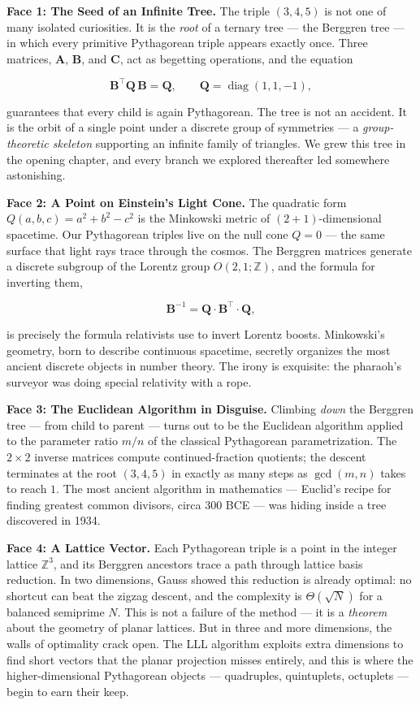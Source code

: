 \textbf{Face 1: The Seed of an Infinite Tree.} The triple \((3, 4, 5)\) is not one of many isolated curiosities. It is the \emph{root} of a ternary tree --- the Berggren tree --- in which every primitive Pythagorean triple appears exactly once. Three matrices, \(\mathbf{A}\), \(\mathbf{B}\), and \(\mathbf{C}\), act as begetting operations, and the equation

\[
\mathbf{B}^{\!\top} \mathbf{Q}\, \mathbf{B} = \mathbf{Q}, \qquad \mathbf{Q} = \operatorname{diag}(1, 1, -1),
\]

guarantees that every child is again Pythagorean. The tree is not an accident. It is the orbit of a single point under a discrete group of symmetries --- a \emph{group-theoretic skeleton} supporting an infinite family of triangles. We grew this tree in the opening chapter, and every branch we explored thereafter led somewhere astonishing.

\textbf{Face 2: A Point on Einstein's Light Cone.} The quadratic form \(Q(a, b, c) = a^2 + b^2 - c^2\) is the Minkowski metric of \((2{+}1)\)-dimensional spacetime. Our Pythagorean triples live on the null cone \(Q = 0\) --- the same surface that light rays trace through the cosmos. The Berggren matrices generate a discrete subgroup of the Lorentz group \(O(2,1;\mathbb{Z})\), and the formula for inverting them,

\[
\mathbf{B}^{-1} = \mathbf{Q} \cdot \mathbf{B}^{\!\top} \cdot \mathbf{Q},
\]

is precisely the formula relativists use to invert Lorentz boosts. Minkowski's geometry, born to describe continuous spacetime, secretly organizes the most ancient discrete objects in number theory. The irony is exquisite: the pharaoh's surveyor was doing special relativity with a rope.

\textbf{Face 3: The Euclidean Algorithm in Disguise.} Climbing \emph{down} the Berggren tree --- from child to parent --- turns out to be the Euclidean algorithm applied to the parameter ratio \(m/n\) of the classical Pythagorean parametrization. The \(2 \times 2\) inverse matrices compute continued-fraction quotients; the descent terminates at the root \((3, 4, 5)\) in exactly as many steps as \(\gcd(m, n)\) takes to reach \(1\). The most ancient algorithm in mathematics --- Euclid's recipe for finding greatest common divisors, circa 300 BCE --- was hiding inside a tree discovered in 1934.

\textbf{Face 4: A Lattice Vector.} Each Pythagorean triple is a point in the integer lattice \(\mathbb{Z}^3\), and its Berggren ancestors trace a path through lattice basis reduction. In two dimensions, Gauss showed this reduction is already optimal: no shortcut can beat the zigzag descent, and the complexity is \(\Theta(\sqrt{N})\) for a balanced semiprime \(N\). This is not a failure of the method --- it is a \emph{theorem} about the geometry of planar lattices. But in three and more dimensions, the walls of optimality crack open. The LLL algorithm exploits extra dimensions to find short vectors that the planar projection misses entirely, and this is where the higher-dimensional Pythagorean objects --- quadruples, quintuplets, octuplets --- begin to earn their keep.

